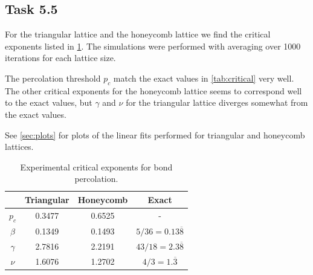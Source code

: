 \documentclass[a4paper]{article}
\begin{document}
\subsection*{Task 5.5}
For the triangular lattice and the honeycomb lattice we find the critical exponents listed in \cref{tab:othercritical}. The simulations were performed with averaging over 1000 iterations for each lattice size. 

The percolation threshold $p_c$ match the exact values in \cref{tab:critical} very well. The other critical exponents for the honeycomb lattice seems to correspond well to the exact values, but $\gamma$ and $\nu$ for the triangular lattice diverges somewhat from the exact values.

See \cref{sec:plots} for plots of the linear fits performed for triangular and honeycomb lattices.

\begin{table}[!h]
\centering
\caption{Experimental critical exponents for bond percolation. \label{tab:othercritical}}
\begin{tabular}{cccc}
\hline
& Triangular & Honeycomb & Exact \\
\hline
$p_c$    & 0.3477 & 0.6525 & - \\
$\beta$  & 0.1349 & 0.1493 & $5/36=0.13\overline{8}$ \\
$\gamma$ & 2.7816 & 2.2191 & $43/18=2.3\overline{8}$ \\
$\nu$    & 1.6076 & 1.2702 & $4/3=1.\overline{3}$ \\
\hline
\end{tabular}
\end{table}
\end{document}
